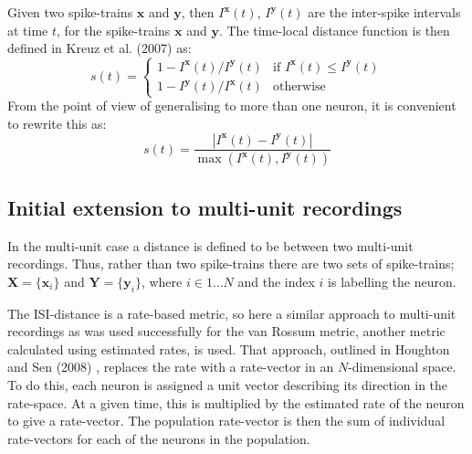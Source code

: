 \documentclass[12pt]{amsart}
\begin{document}
Given two spike-trains $\mathbf{x}$ and $\mathbf{y}$, then $I^{\mathbf{x}}(t)$, $I^{\mathbf{y}}(t)$ are the inter-spike intervals at time $t$, for the spike-trains $\mathbf{x}$ and $\mathbf{y}$.  The time-local distance function is then defined in Kreuz et al. (2007) as:
\begin{equation}
s(t) = \left\{ \begin{array}{ll} 1-I^{\mathbf{x}}(t) / I^{\mathbf{y}}(t)  & \text{if } I^{\mathbf{x}}(t) \leq I^{\mathbf{y}}(t) \\ 1- I^{\mathbf{y}}(t) / I^{\mathbf{x}}(t)  & \text{otherwise} \end{array} \right.
\end{equation}
From the point of view of generalising to more than one neuron, it is convenient to rewrite this as:
\begin{equation}
s(t) = \frac{ | I^{\mathbf{x}}(t) - I^{\mathbf{y}}(t) | }{\max (I^{\mathbf{x}}(t), I^{\mathbf{y}}(t)) }
\end{equation}

\subsection{Initial extension to multi-unit recordings}

In the multi-unit case a distance is defined to be between two multi-unit recordings.  Thus, rather than two spike-trains there are two sets of spike-trains; $\mathbf{X}=\{ \mathbf{x}_i \}$ and $ \mathbf{Y}=\{ \mathbf{y}_i \}$, where $i \in 1\ldots N$ and the index $i$ is labelling the neuron.

The ISI-distance is a rate-based metric, so here a similar approach to multi-unit recordings as was used successfully for the van Rossum metric, another metric calculated using estimated rates, is used.  That approach, outlined in Houghton and Sen (2008) \cite{HoughtonSen2008}, replaces the rate with a rate-vector in an $N$-dimensional space.  To do this, each neuron is assigned a unit vector describing its direction in the rate-space.  At a given time, this is multiplied by the estimated rate of the neuron to give a rate-vector. The population rate-vector is then the sum of individual rate-vectors for each of the neurons in the population.  
\end{document}
